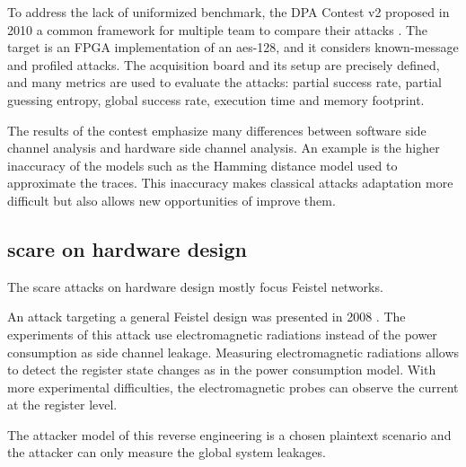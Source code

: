 \documentclass[11pt]{sdm}
\begin{document}
To address the lack of uniformized benchmark, the DPA Contest v2 proposed in 2010 a common framework for multiple team to compare their attacks \parencite{Clavier_Danger_Duc_Elaabid_Gérard_Guilley_Heuser_Kasper_Li_Lomné_et_al_2014}.
The target is an FPGA implementation of an \acrshort{aes}-128, and it considers known-message and profiled attacks.
The acquisition board and its setup are precisely defined, and many metrics are used to evaluate the attacks: partial success rate, partial guessing entropy, global success rate, execution time and memory footprint.

The results of the contest emphasize many differences between software side channel analysis and hardware side channel analysis.
An example is the higher inaccuracy of the models such as the Hamming distance model used to approximate the traces.
This inaccuracy makes classical attacks adaptation more difficult but also allows new opportunities of improve them.



\subsection{\gls{scare} on hardware design}

The \gls{scare} attacks on hardware design mostly focus Feistel networks.

An attack targeting a general Feistel design was presented in 2008 \parencite{Réal_Dubois_Guilloux_Valette_Drissi_2008}.
The experiments of this attack use electromagnetic radiations instead of the power consumption as side channel leakage.
Measuring electromagnetic radiations allows to detect the register state changes as in the power consumption model.
With more experimental difficulties, the electromagnetic probes can observe the current at the register level.

The attacker model of this reverse engineering is a chosen plaintext scenario and the attacker can only measure the global system leakages.
\end{document}

